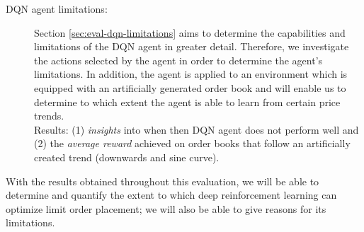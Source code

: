 \begin{description}
    \item[DQN agent limitations: ]
    Section \ref{sec:eval-dqn-limitations} aims to determine the capabilities and limitations of the DQN agent in greater detail.
    Therefore, we investigate the actions selected by the agent in order to determine the agent's limitations.
    In addition, the agent is applied to an environment which is equipped with an artificially generated order book and will enable us to determine to which extent the agent is able to learn from certain price trends.
    \\
    Results: (1) \textit{insights} into when then DQN agent does not perform well and (2) the \textit{average reward} achieved on order books that follow an artificially created trend (downwards and sine curve).
\end{description}
With the results obtained throughout this evaluation, we will be able to determine and quantify the extent to which deep reinforcement learning can optimize limit order placement; we will also be able to give reasons for its limitations.

